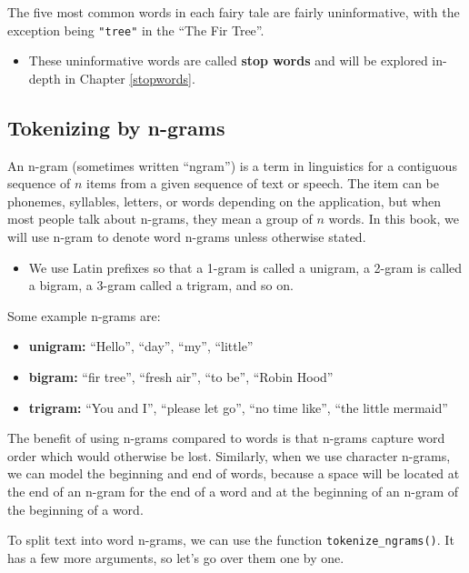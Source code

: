 \documentclass[
]{krantz}
\newenvironment{rmdblock}[1]
  {\begin{shaded*}
  \begin{itemize}[left = -1cm, labelsep = 1cm]
  \renewcommand{\labelitemi}{
    \raisebox{-.7\height}[0pt][0pt]{
      {\setkeys{Gin}{width=3em,keepaspectratio}\texttt{[image: images/\#1]}}
    }
  }
 
  \item
  }
  {
  \end{itemize}
  \end{shaded*}
  }
\newenvironment{rmdnote}
  {\begin{rmdblock}{note}}
  {\end{rmdblock}}
\newenvironment{rmdwarning}
  {\begin{rmdblock}{warning}}
  {\end{rmdblock}}
\begin{document}
The five most common words in each fairy tale are fairly uninformative, with the exception being \texttt{"tree"} in the ``The Fir Tree''.

\begin{rmdwarning}
These uninformative words are called \textbf{stop words} and will be explored in-depth in Chapter \ref{stopwords}.
\end{rmdwarning}

\hypertarget{tokenizingngrams}{%
\subsection{Tokenizing by n-grams}\label{tokenizingngrams}}

An n-gram (sometimes written ``ngram'') is a term in linguistics for a contiguous sequence of \(n\) items from a given sequence of text or speech. The item can be phonemes, syllables, letters, or words depending on the application, but when most people talk about n-grams, they mean a group of \(n\) words. In this book, we will use n-gram to denote word n-grams unless otherwise stated.

\begin{rmdnote}
We use Latin prefixes so that a 1-gram is called a unigram, a 2-gram is
called a bigram, a 3-gram called a trigram, and so on.
\end{rmdnote}

Some example n-grams are:

\begin{itemize}
\item
  \textbf{unigram:} ``Hello'', ``day'', ``my'', ``little''
\item
  \textbf{bigram:} ``fir tree'', ``fresh air'', ``to be'', ``Robin Hood''
\item
  \textbf{trigram:} ``You and I'', ``please let go'', ``no time like'', ``the little mermaid''
\end{itemize}

The benefit of using n-grams compared to words is that n-grams capture word order which would otherwise be lost. Similarly, when we use character n-grams, we can model the beginning and end of words, because a space will be located at the end of an n-gram for the end of a word and at the beginning of an n-gram of the beginning of a word.

To split text into word n-grams, we can use the function \texttt{tokenize\_ngrams()}. It has a few more arguments, so let's go over them one by one.
\end{document}

